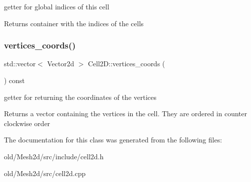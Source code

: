 getter for global indices of this cell 

\begin{DoxyReturn}{Returns}
container with the indices of the cells 
\end{DoxyReturn}
\mbox{\label{classMeshFramework2D_1_1Cell2D_a3a7aff59de8ef842d92e17b29de65be4}} 
\subsubsection{\texorpdfstring{vertices\+\_\+coords()}{vertices\_coords()}}
{\footnotesize\ttfamily std\+::vector$<$ Vector2d $>$ Cell2\+D\+::vertices\+\_\+coords (\begin{DoxyParamCaption}{ }\end{DoxyParamCaption}) const}



getter for returning the coordinates of the vertices 

\begin{DoxyReturn}{Returns}
a vector containing the vertices in the cell. They are ordered in counter clockwise order 
\end{DoxyReturn}


The documentation for this class was generated from the following files\+:\begin{DoxyCompactItemize}
\item 
old/\+Mesh2d/src/include/cell2d.\+h\item 
old/\+Mesh2d/src/cell2d.\+cpp\end{DoxyCompactItemize}
